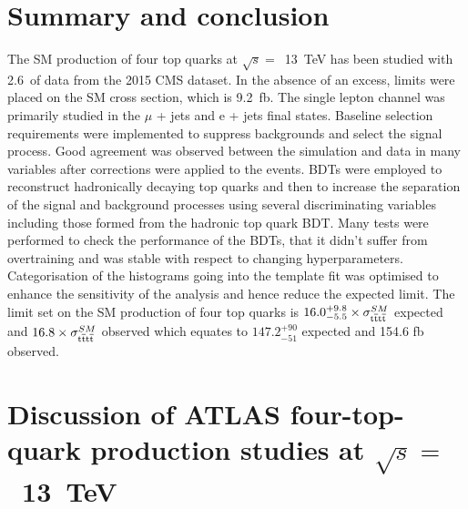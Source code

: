 \section{Summary and conclusion}
\label{sec:summary13}

The SM production of four top quarks at $\sqrt{s} =$~13~TeV has been studied with 2.6~\fbinv of data from the 2015 CMS dataset. In the absence of an excess, limits were placed on the SM cross section, which is 9.2~fb. The single lepton channel was primarily studied in the $\mu$ + jets and e + jets final states. Baseline selection requirements were implemented to suppress backgrounds and select the signal \tttt process. Good agreement was observed between the simulation and data in many variables after corrections were applied to the events. BDTs were employed to reconstruct hadronically decaying top quarks and then to increase the separation of the signal and background processes using several discriminating variables including those formed from the hadronic top quark BDT. Many tests were performed to check the performance of the BDTs, that it didn't suffer from overtraining and was stable with respect to changing hyperparameters. Categorisation of the histograms going into the template fit was optimised to enhance the sensitivity of the analysis and hence reduce the expected limit. The limit set on the SM production of four top quarks is $16.0^{+9.8}_{-5.5}\times \sigma_{{\mathrm{t}\overline{\mathrm{t}}\mathrm{t}\overline{\mathrm{t}}}}^{SM} $ expected and $16.8\times \sigma_{{\mathrm{t}\overline{\mathrm{t}}\mathrm{t}\overline{\mathrm{t}}}}^{SM} $ observed which equates to $147.2^{+90}_{-51}$ expected and 154.6 fb observed.

\section{Discussion of ATLAS four-top-quark production studies at $\sqrt{s} =$~13~TeV}
\label{sec:ATLASresult13}


